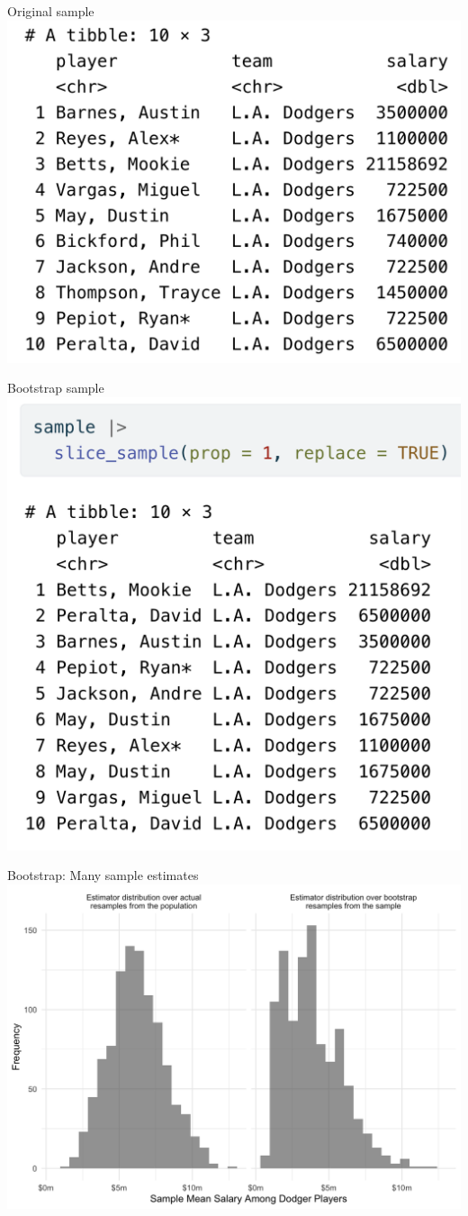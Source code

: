 \documentclass{beamer}
\begin{document}
\begin{frame}{Original sample}
\includegraphics[width = .7\textwidth]{figures/original_sample}
\end{frame}

\begin{frame}{Bootstrap sample}
\includegraphics[width = .7\textwidth]{figures/bootstrap_sample}
\end{frame}

\begin{frame}{Bootstrap: Many sample estimates}
\includegraphics[width = \textwidth]{figures/bs_dist}
\end{frame}
\end{document}
